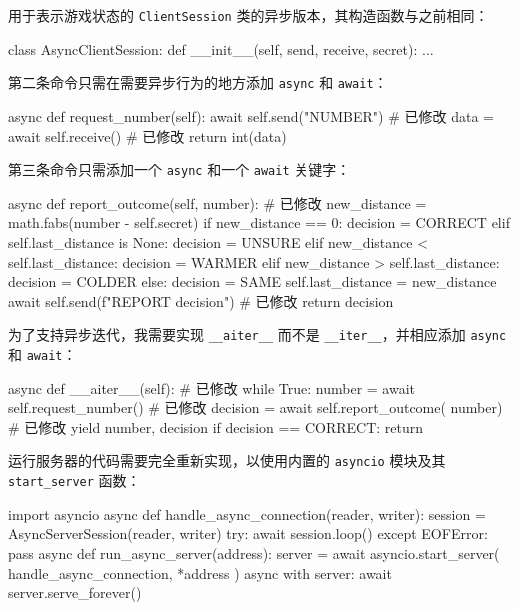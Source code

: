 用于表示游戏状态的 \texttt{ClientSession} 类的异步版本，其构造函数与之前相同：

\begin{codebox}[python]
class AsyncClientSession:
    def __init__(self, send, receive, secret):
        ...
\end{codebox}

第二条命令只需在需要异步行为的地方添加 \texttt{async} 和 \texttt{await}：

\begin{codebox}[python]
    async def request_number(self):
        await self.send("NUMBER")    # 已修改
        data = await self.receive()  # 已修改
        return int(data)
\end{codebox}

第三条命令只需添加一个 \texttt{async} 和一个 \texttt{await} 关键字：

\begin{codebox}[python]
    async def report_outcome(self, number):    # 已修改
        new_distance = math.fabs(number - self.secret)
        if new_distance == 0:
            decision = CORRECT
        elif self.last_distance is None:
            decision = UNSURE
        elif new_distance < self.last_distance:
            decision = WARMER
        elif new_distance > self.last_distance:
            decision = COLDER
        else:
            decision = SAME
        self.last_distance = new_distance
        await self.send(f"REPORT {decision}")         # 已修改
        return decision
\end{codebox}

为了支持异步迭代，我需要实现 \texttt{\_\_aiter\_\_} 而不是 \texttt{\_\_iter\_\_}，并相应添加 \texttt{async} 和 \texttt{await}：

\begin{codebox}[python]
    async def __aiter__(self):                        # 已修改
        while True:
            number = await self.request_number()      # 已修改
             decision = await self.report_outcome(
    number)                               # 已修改
            yield number, decision
            if decision == CORRECT:
                return
\end{codebox}

运行服务器的代码需要完全重新实现，以使用内置的 \texttt{asyncio} 模块及其 \texttt{start\_server} 函数：

\begin{codebox}[python]
import asyncio
async def handle_async_connection(reader, writer):
    session = AsyncServerSession(reader, writer)
    try:
        await session.loop()
    except EOFError:
        pass
async def run_async_server(address):
    server = await asyncio.start_server(
        handle_async_connection, *address
    )
    async with server:
        await server.serve_forever()
\end{codebox}

